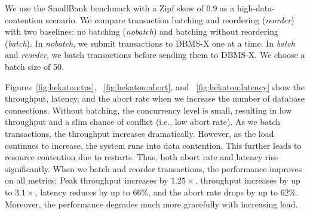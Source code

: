We use the SmallBank benchmark with a Zipf skew of 0.9 as a high-data-contention scenario. We compare transaction batching and reordering (\emph{reorder}) with two baselines: no batching (\emph{nobatch}) and batching without reordering (\emph{batch}). In \emph{nobatch}, we submit transactions to DBMS-X one at a time. In \emph{batch} and \emph{reorder}, we batch transactions before sending them to DBMS-X. We choose a batch size of 50.

Figures~\ref{fig:hekaton:tps}, ~\ref{fig:hekaton:abort}, and ~\ref{fig:hekaton:latency} show the throughput, latency, and the abort rate when we increase the number of database connections. Without batching, the concurrency level is small, resulting in low throughput and a slim chance of conflict (i.e., low abort rate). 
As we batch transactions, the throughput increases dramatically. 
However, as the load continues to increase, the system runs into data contention. This further leads to resource contention due to restarts. Thus, both abort rate and latency rise significantly. When we batch and reorder transactions, the performance improves on all metrics: Peak throughput increases by $1.25\times$, throughput increases by up to $3.1\times$, latency reduces by up to $66\%$, and the abort rate drops by up to $62\%$.  Moreover, the performance degrades much more gracefully with increasing load.
